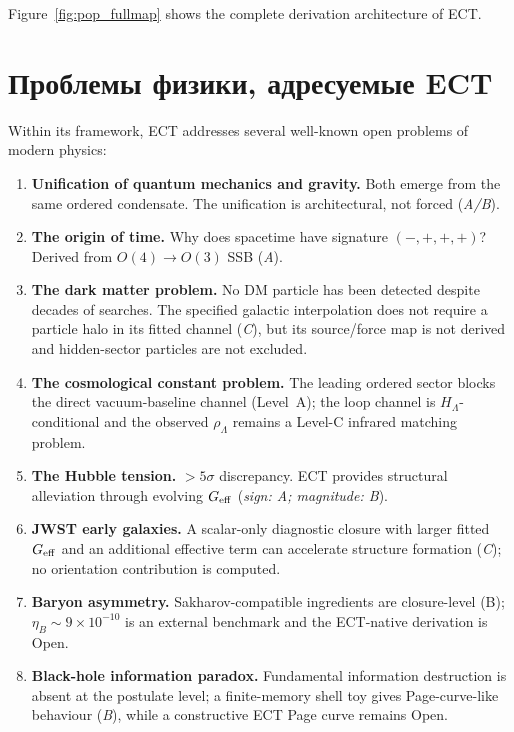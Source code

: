 \documentclass[11pt,a4paper]{article}
\begin{document}
Figure~\ref{fig:pop_fullmap} shows the complete derivation architecture of ECT.


\section{Проблемы физики, адресуемые ECT}

Within its framework, ECT addresses several well-known open problems of modern physics:

\begin{enumerate}
\item \textbf{Unification of quantum mechanics and gravity.} Both emerge from the same ordered condensate. The unification is architectural, not forced (\emph{A/B}).

\item \textbf{The origin of time.} Why does spacetime have signature $(-,+,+,+)$? Derived from $O(4)\to O(3)$ SSB (\emph{A}).

\item \textbf{The dark matter problem.} No DM particle has been detected despite decades of searches.  The specified galactic interpolation does not require a particle halo in its fitted channel (\emph{C}), but its source/force map is not derived and hidden-sector particles are not excluded.

\item \textbf{The cosmological constant problem.} The leading ordered sector blocks the direct vacuum-baseline channel (Level~A); the loop channel is $H_\Lambda$-conditional and the observed $\rho_\Lambda$ remains a Level-C infrared matching problem.

\item \textbf{The Hubble tension.} $>5\sigma$ discrepancy. ECT provides structural alleviation through evolving $G_{\rm eff}$ (\emph{sign: A; magnitude: B}).

\item \textbf{JWST early galaxies.} A scalar-only diagnostic closure with larger fitted $G_{\rm eff}$ and an additional effective term can accelerate structure formation (\emph{C}); no orientation contribution is computed.

\item \textbf{Baryon asymmetry.} Sakharov-compatible ingredients are closure-level (B); $\eta_B\sim9\times10^{-10}$ is an external benchmark and the ECT-native derivation is Open.

\item \textbf{Black-hole information paradox.} Fundamental information destruction is absent at the postulate level; a finite-memory shell toy gives Page-curve-like behaviour (\emph{B}), while a constructive ECT Page curve remains Open.


\end{enumerate}
\end{document}
